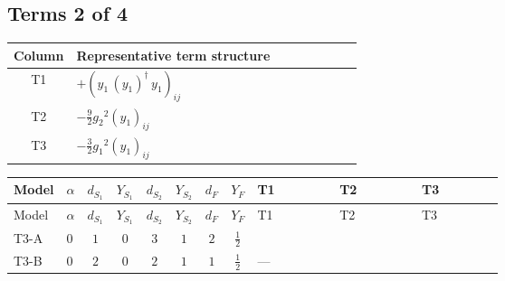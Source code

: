 \documentclass[8pt]{article}
\begin{document}
\begin{landscape}
\subsection*{Terms 2 of 4}
\begin{center}
\begin{tabular}{@{}c >{\raggedright\arraybackslash}p{0.82\linewidth}@{}}
\toprule
Column & Representative term structure \\
\midrule
T1 & \(\displaystyle +\left({y_1}\,\left({y_1}\right)^{\dagger}\,{y_1}\right)_{ij}\) \\
\midrule
T2 & \(\displaystyle -\frac{9}{2} {g_2}^2 \left({y_1}\right)_{ij}\) \\
\midrule
T3 & \(\displaystyle -\frac{3}{2} {g_1}^2 \left({y_1}\right)_{ij}\) \\
\midrule
\bottomrule
\end{tabular}
\end{center}
\smallskip
\tiny
\begin{longtable}{@{}llcccccc >{\raggedright\arraybackslash}p{0.21\linewidth} >{\raggedright\arraybackslash}p{0.21\linewidth} >{\raggedright\arraybackslash}p{0.21\linewidth}@{}}
\toprule
Model & $\alpha$ & $d_{S_1}$ & $Y_{S_1}$ & $d_{S_2}$ & $Y_{S_2}$ & $d_F$ & $Y_F$ & T1 & T2 & T3 \\
\midrule
\endfirsthead
\toprule
Model & $\alpha$ & $d_{S_1}$ & $Y_{S_1}$ & $d_{S_2}$ & $Y_{S_2}$ & $d_F$ & $Y_F$ & T1 & T2 & T3 \\
\midrule
\endhead
T3-A & $0$ & $1$ & $0$ & $3$ & $1$ & $2$ & $\frac{1}{2}$ & \scriptsize\adjustbox{max width=\linewidth}{$\begin{gathered} +\left({y_1}\,\left({y_1}\right)^{\dagger}\,{y_1}\right)_{ij}\end{gathered}$} & \scriptsize\adjustbox{max width=\linewidth}{$\begin{gathered} -\frac{9}{2} {g_2}^2 \left({y_1}\right)_{ij}\end{gathered}$} & \scriptsize\adjustbox{max width=\linewidth}{$\begin{gathered} -\frac{3}{2} {g_1}^2 \left({y_1}\right)_{ij}\end{gathered}$} \\
\midrule
T3-B & $0$ & $2$ & $0$ & $2$ & $1$ & $1$ & $\frac{1}{2}$ & --- & \scriptsize\adjustbox{max width=\linewidth}{$\begin{gathered} -\frac{9}{4} {g_2}^2 \left({y_1}\right)_{ij}\end{gathered}$} & \scriptsize\adjustbox{max width=\linewidth}{$\begin{gathered} -\frac{3}{2} {g_1}^2 \left({y_1}\right)_{ij}\end{gathered}$} \\

\end{longtable}
\end{landscape}
\end{document}
